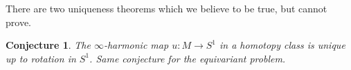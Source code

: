 \documentclass{ip-journal}
\newtheorem{conjecture}[theorem]{Conjecture}
\newtheorem{thmconj}[theorem]{Theorem-Conjecture}
\theoremstyle{definition}
\numberwithin{equation}{section}
\newcommand{\R}{\mathbb R}
\begin{document}




There are two uniqueness theorems which we believe to be true, but cannot prove.
\begin{conjecture}\label{Conjecture 2} The $\infty$-harmonic map $u: M \rightarrow S^1$ in a homotopy class is unique up to rotation in $S^1$. Same conjecture for the equivariant problem.
\end{conjecture}

\end{document}
